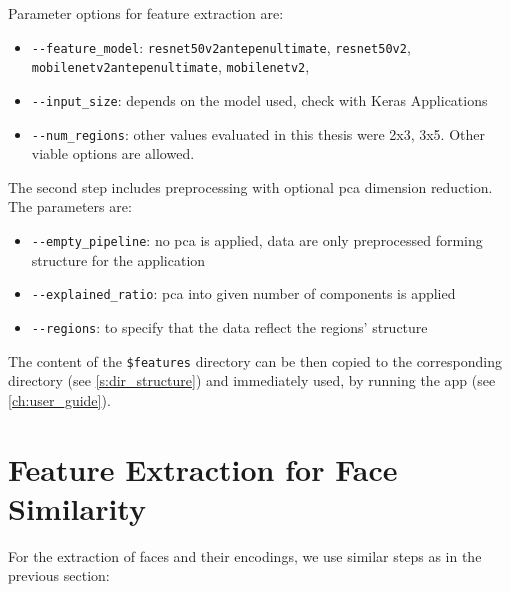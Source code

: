 \vspace{0.5cm}

Parameter options for feature extraction are:
\begin{itemize}
    \item \verb+--feature_model+: \verb+resnet50v2antepenultimate+, \verb+resnet50v2+, \\ \verb+mobilenetv2antepenultimate+, \verb+mobilenetv2+, 
    \item \verb+--input_size+: depends on the model used, check with Keras Applications
    \item \verb+--num_regions+: other values evaluated in this thesis were 2x3, 3x5. Other viable options are allowed.
\end{itemize}

The second step includes preprocessing with optional \acrshort{pca} dimension reduction. The parameters are:
\begin{itemize}
    \item \verb+--empty_pipeline+: no \acrshort{pca} is applied, data are only preprocessed forming structure for the application
    \item \verb+--explained_ratio+: \acrshort{pca} into given number of components is applied
    \item \verb+--regions+: to specify that the data reflect the regions' structure
\end{itemize}

The content of the \verb+$features+ directory can be then copied to the corresponding directory (see  \autoref{s:dir_structure}) and immediately used, by running the app (see \autoref{ch:user_guide}).

\section{Feature Extraction for Face Similarity}

For the extraction of faces and their encodings, we use similar steps as in the previous section:

\vspace{0.5cm}
\vspace{0.5cm}

